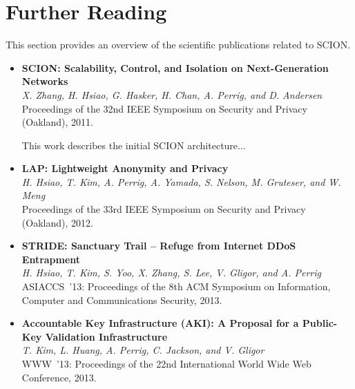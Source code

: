 \chapter{Further Reading}

This section provides an overview of the scientific publications related to SCION.

\begin{itemize}

\item \textbf{SCION: Scalability, Control, and Isolation on Next-Generation Networks}~\cite{ZHHCPA2011}\\
\textit{X. Zhang, H. Hsiao, G. Hasker, H. Chan, A. Perrig, and D. Andersen} \\
{\footnotesize Proceedings of the 32nd IEEE Symposium on Security and Privacy (Oakland), 2011.}

This work describes the initial SCION architecture...


\item \textbf{LAP: Lightweight Anonymity and Privacy}~\cite{HKPYNGM2012}\\
\textit{H. Hsiao, T. Kim, A. Perrig, A. Yamada, S. Nelson, M. Gruteser, and W. Meng} \\
{\footnotesize Proceedings of the 33rd IEEE Symposium on Security and Privacy (Oakland), 2012.}


\item \textbf{STRIDE: Sanctuary Trail – Refuge from Internet DDoS Entrapment}~\cite{HKYZLGP2013}\\
\textit{H. Hsiao, T. Kim, S. Yoo, X. Zhang, S. Lee, V. Gligor, and A. Perrig} \\
{\footnotesize ASIACCS~'13: Proceedings of the 8th ACM Symposium on Information, Computer and Communications Security, 2013.}


\item \textbf{Accountable Key Infrastructure (AKI): A Proposal for a Public-Key Validation Infrastructure}~\cite{KHPJG2013}\\
\textit{T. Kim, L. Huang, A. Perrig, C. Jackson, and V. Gligor} \\
{\footnotesize WWW~'13: Proceedings of the 22nd International World Wide Web Conference, 2013.}




\end{itemize}


